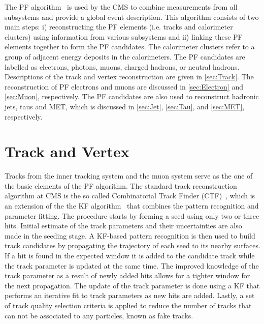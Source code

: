 The \ac{PF} algorithm~\cite{CMS:2017yfk} is used by the \ac{CMS} to combine measurements from all subsystems and provide a global event description. This algorithm consists of two main steps: i) reconstructing the \ac{PF} elements (i.e. tracks and calorimeter clusters) using information from various subsystems and ii) linking these \ac{PF} elements together to form the \ac{PF} candidates. The calorimeter clusters refer to a group of adjacent energy deposits in the calorimeters. The \ac{PF} candidates are labelled as electrons, photons, muons, charged hadrons, or neutral hadrons. Descriptions of the track and vertex reconstruction are given in \autoref{sec:Track}. The reconstruction of \ac{PF} electrons and muons are discussed in \autoref{sec:Electron} and \autoref{sec:Muon}, respectively. The \ac{PF} candidates are also used to reconstruct hadronic jets, taus and \ac{MET}, which is discussed in \autoref{sec:Jet}, \autoref{sec:Tau}, and \autoref{sec:MET}, respectively.

\section{Track and Vertex}
\label{sec:Track}

Tracks from the inner tracking system and the muon system serve as the one of the basic elements of the \ac{PF} algorithm. The standard track reconstruction algorithm at \ac{CMS} is the so called Combinatorial Track Finder (CTF)~\cite{Speer:2005dp}, which is an extension of the the \ac{KF} algorithm~\cite{Fruhwirth:1987fm} that combines the pattern recognition and parameter fitting. The procedure starts by forming a seed using only two or three hits. Initial estimate of the track parameters and their uncertainties are also made in the seeding stage. A \ac{KF}-based pattern recognition is then used to build track candidates by propagating the trajectory of each seed to its nearby surfaces. If a hit is found in the expected window it is added to the candidate track while the track parameter is updated at the same time. The improved knowledge of the track parameter as a result of newly added hits allows for a tighter window for the next propagation. The update of the track parameter is done using a \ac{KF} that performs an iterative fit to track parameters as new hits are added. Lastly, a set of track quality selection criteria is applied to reduce the number of tracks that can not be associated to any particles, known as fake tracks. 

